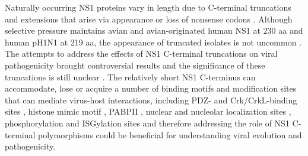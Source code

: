 		Naturally occurring \gls{NS1} proteins vary in length due to C-terminal truncations and extensions that arise via appearance or loss of nonsense codons \parencite{Parvin1983}. Although selective pressure maintains avian and avian-originated human \gls{NS1} at 230 aa and human pH1N1 at 219 aa, the appearance of truncated isolates is not uncommon \parencite{Suarez1998, Lakspere2014}. The attempts to address the effects of \gls{NS1} C-terminal truncations on viral pathogenicity brought controversial results and the significance of these truncations is still unclear \parencite{Hale2010e, Tu2011a}. The relatively short NS1 C-terminus can accommodate, lose or acquire a number of binding motifs and modification sites that can mediate virus-host interactions, including PDZ- and Crk/CrkL-binding sites \parencite{Heikkinen2008, Liu2010}, histone mimic motif \parencite{Marazzi2012}, \gls{PABP}II  \parencite{Li2001a}, nuclear and nucleolar localization sites \parencite{Melen2012}, phosphorylation \parencite{Hsiang2012} and \gls{ISG}ylation sites \parencite{Hsiang2009} and therefore addressing the role of NS1 C-terminal polymorphisms could be beneficial for understanding viral evolution and pathogenicity.
		
		
		
		
		
		
		
		
		
				
		
		
